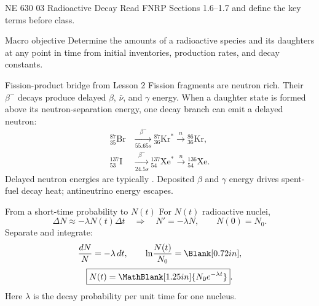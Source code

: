\HandoutSetup
  {NE 630}
  {03}
  {Radioactive Decay}
  {Read FNRP Sections 1.6--1.7 and define the key terms before class.}


\MakeHandoutTitle

\begin{handoutcolumns}

\begin{fixedbox}{Macro objective}
Determine the amounts of a radioactive species and its daughters at any point
in time from initial inventories, production rates, and decay constants.
\end{fixedbox}



\begin{fixedbox}{Fission-product bridge from Lesson 2}
Fission fragments are neutron rich. Their $\beta^-$ decays produce delayed
$\beta$, $\bar\nu$, and $\gamma$ energy. When a daughter state is formed above
its neutron-separation energy, one decay branch can emit a delayed neutron:
\scriptsize
\begin{align*}
{}^{87}_{35}\mathrm{Br}
 &\xrightarrow[55.65\unit{s}]{\beta^-}
 {}^{87}_{36}\mathrm{Kr}^{*}
 \xrightarrow{n}{}^{86}_{36}\mathrm{Kr},\\[-1pt]
{}^{137}_{53}\mathrm{I}
 &\xrightarrow[24.5\unit{s}]{\beta^-}
 {}^{137}_{54}\mathrm{Xe}^{*}
 \xrightarrow{n}{}^{136}_{54}\mathrm{Xe}.
\end{align*}
\normalsize
Delayed neutron energies are typically
.
Deposited $\beta$ and $\gamma$ energy
drives spent-fuel decay heat; antineutrino energy escapes.
\end{fixedbox}


\begin{boardbox}{From a short-time probability to $N(t)$}
For $N(t)$ radioactive nuclei,
\[
 \Delta N\approx-\lambda N(t)\Delta t
 \quad\Longrightarrow\quad
 \boxed{N'=-\lambda N},\qquad N(0)=N_0.
\]
Separate and integrate:
\[
 \frac{dN}{N}=-\lambda\,dt,
 \qquad
 \ln\!\frac{N(t)}{N_0}=\Blank[0.72in],
\]
\[
 \boxed{N(t)=\MathBlank[1.25in]{N_0e^{-\lambda t}}}.
\]
Here $\lambda$ is the decay probability per unit time for one nucleus.
\end{boardbox}


\end{handoutcolumns}

